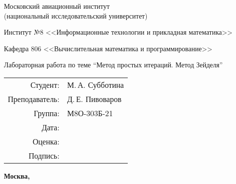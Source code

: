 \begin{titlepage}
\begin{center}
\bfseries

{\Large Московский авиационный институт\\ (национальный исследовательский университет)

}

\vspace{48pt}

{\large Институт №8 <<Информационные технологии и прикладная математика>>
}

\vspace{36pt}

{\large Кафедра 806 <<Вычислительная математика и программирование>>

}


\vspace{48pt}

Лабораторная работа по теме \enquote{Метод простых итераций. Метод Зейделя}

\end{center}

\vspace{72pt}

\begin{flushright}
\begin{tabular}{rl}
Студент: & М.\,А. Субботина \\
Преподаватель: & Д.\,Е. Пивоваров \\
Группа: & М8О-303Б-21 \\
Дата: & \\
Оценка: & \\
Подпись: & \\
\end{tabular}
\end{flushright}

\vfill

\begin{center}
\bfseries
Москва, \the\year
\end{center}
\end{titlepage}

\pagebreak

